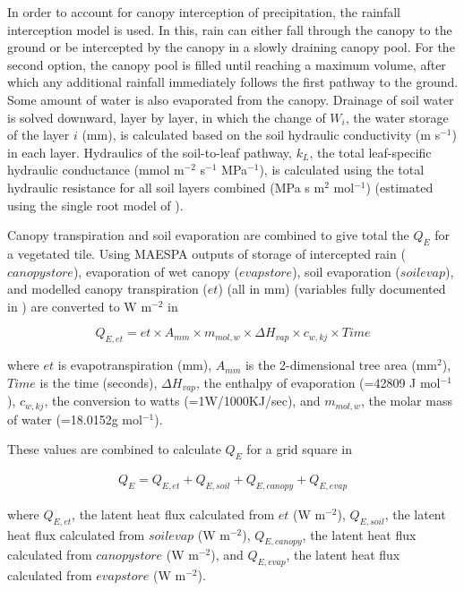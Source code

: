 \documentclass[final,3p,times,authoryear]{elsarticle}
\begin{document}
In order to account for canopy interception of precipitation, the \cite{Rutter1975} rainfall interception model is used. In this, rain can either fall through the canopy to the ground or be intercepted by the canopy in a slowly draining canopy pool. For the second option, the canopy pool is filled until reaching a maximum volume, after which any additional rainfall immediately follows the first pathway to the ground. Some amount of water is also evaporated from the canopy. Drainage of soil water is solved downward, layer by layer, in which the change of $W_{i}$, the water storage of the layer $i$ (mm), is calculated based on the soil hydraulic conductivity (m s$^{-1}$) in each layer. Hydraulics of the soil-to-leaf pathway, $k_{L}$, the total leaf-specific hydraulic conductance (mmol m$^{-2}$ s$^{-1}$ MPa$^{-1}$), is calculated using the total hydraulic resistance for all soil layers combined (MPa s m$^{2}$ mol$^{-1}$) (estimated using the single root model of \cite{Gardner1960}).

Canopy transpiration and soil evaporation are combined to give total the $Q_{E}$ for a vegetated tile. Using MAESPA outputs of storage of intercepted rain ($canopystore$), evaporation of wet canopy ($evapstore$), soil evaporation ($soilevap$), and modelled canopy transpiration ($et$) (all in mm) (variables fully documented in \cite{Duursma2016}) are converted to W m$^{-2}$ in 


\begin{equation}\label{eq:mmtowm2} 
  Q_{E,et} = et \times A _{mm} \times m_{mol,w} \times \Delta H_{vap} \times c_{w,kj} \times Time  
\end{equation} 
 
where $et$ is evapotranspiration (mm), $A _{mm}$ is the 2-dimensional tree area (mm$^{2}$), $Time$ is the time (seconds), $\Delta H_{vap}$, the enthalpy of evaporation (=42809 J mol$^{-1}$), $c_{w,kj}$, the conversion to watts (=1W/1000KJ/sec), and $m_{mol,w}$, the molar mass of water (=18.0152g mol$^{-1}$).

These values are combined to calculate $Q_{E}$ for a grid square in 


\begin{equation}\label{eq:lefromet} 
\begin{aligned}
Q_{E} = Q_{E,et} + Q_{E,soil} + Q_{E,canopy} + Q_{E,evap} 
\end{aligned}
\end{equation}

where $Q_{E,et}$, the latent heat flux calculated from $et$ (W m$^{-2}$), $Q_{E,soil}$, the latent heat flux calculated from $soilevap$ (W m$^{-2}$), $Q_{E,canopy}$, the latent heat flux calculated from $canopystore$ (W m$^{-2}$), and $Q_{E,evap}$, the latent heat flux calculated from $evapstore$ (W m$^{-2}$).
\end{document}
